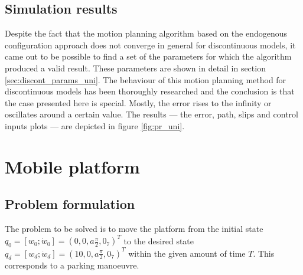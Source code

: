 \subsection{Simulation results}
Despite the fact that the motion planning algorithm based on the endogenous 
configuration approach does not converge in general for discontinuous models,
it came out to be possible to find a set of the parameters for which the algorithm produced
a valid result. These parameters are shown in detail in section \ref{sec:discont_params_uni}.
The behaviour of this motion planning method for discontinuous models has been thoroughly researched
and the conclusion is that the case presented here is special. Mostly, the error rises to the infinity
or oscillates around a certain value.
The results --- the error, path, slips and control inputs plots --- are depicted
in figure \ref{fig:pr_uni}.



\section{Mobile platform}
\subsection{Problem formulation}
\label{sec:rex_task}
The problem to be solved is to move the platform from the initial state
$q_0 = [w_0; \dot{w}_0] = (0, 0, a\frac{\pi}{2}, 0_7)^T$ to the desired state
$q_d = [w_d; \dot{w}_d] = (10, 0, a\frac{\pi}{2}, 0_7)^T$
within the given amount of time $T$. 
This corresponds to a parking manoeuvre.
%

